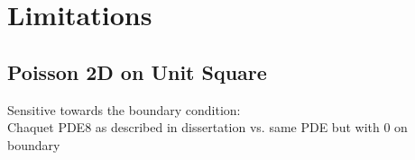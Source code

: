 \documentclass[./\jobname.tex]{subfiles}
\begin{document}
\chapter{Limitations}

\section{Poisson 2D on Unit Square}

Sensitive towards the boundary condition: \\
Chaquet PDE8 as described in dissertation vs. same PDE but with 0 on boundary
\end{document}
